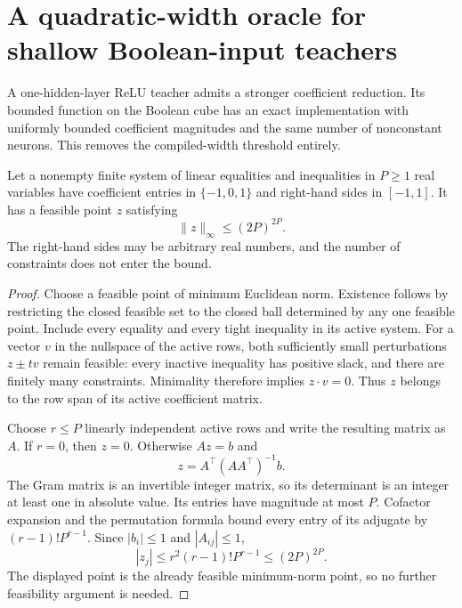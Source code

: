 \section{A quadratic-width oracle for shallow Boolean-input teachers}
\label{sec:shallow-Boolean}
A one-hidden-layer ReLU teacher admits a stronger coefficient reduction. Its bounded function on the Boolean cube has an exact implementation with uniformly bounded coefficient magnitudes and the same number of nonconstant neurons. This removes the compiled-width threshold entirely.

\begin{lemma}
\label{lem:bounded-polyhedron}
Let a nonempty finite system of linear equalities and inequalities in $P\ge1$ real variables have coefficient entries in $\{-1,0,1\}$ and right-hand sides in $[-1,1]$. It has a feasible point $z$ satisfying
\[
 \|z\|_\infty\le(2P)^{2P}.
\]
The right-hand sides may be arbitrary real numbers, and the number of constraints does not enter the bound.
\end{lemma}
\begin{proof}
Choose a feasible point of minimum Euclidean norm. Existence follows by restricting the closed feasible set to the closed ball determined by any one feasible point. Include every equality and every tight inequality in its active system. For a vector $v$ in the nullspace of the active rows, both sufficiently small perturbations $z\pm t v$ remain feasible: every inactive inequality has positive slack, and there are finitely many constraints. Minimality therefore implies $z\cdot v=0$. Thus $z$ belongs to the row span of its active coefficient matrix.

Choose $r\le P$ linearly independent active rows and write the resulting matrix as $A$. If $r=0$, then $z=0$. Otherwise $Az=b$ and
\[
 z=A^\top(AA^\top)^{-1}b.
\]
The Gram matrix is an invertible integer matrix, so its determinant is an integer at least one in absolute value. Its entries have magnitude at most $P$. Cofactor expansion and the permutation formula bound every entry of its adjugate by $(r-1)!P^{r-1}$. Since $|b_i|\le1$ and $|A_{ij}|\le1$,
\[
 |z_j|\le r^2(r-1)!P^{r-1}\le(2P)^{2P}.
\]
The displayed point is the already feasible minimum-norm point, so no further feasibility argument is needed.
\end{proof}

